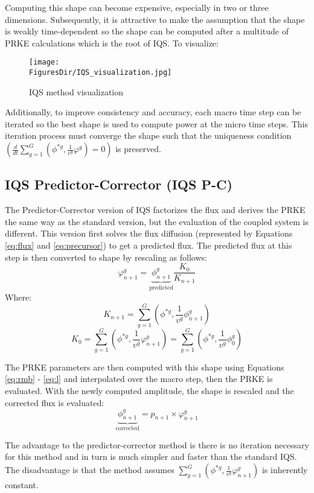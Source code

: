 \documentclass[12pt]{scrartcl}
\newcommand{\be}{\begin{equation}}
\newcommand{\ee}{\end{equation}}
\newcommand{\FiguresDir}{./figs}
\begin{document}
Computing this shape can become expensive, especially in two or three dimensions.  Subsequently, it is attractive to make the assumption that the shape is weakly time-dependent so the shape can be computed after a multitude of PRKE calculations which is the root of IQS.  To visualize:
\begin{figure}[!htbp]
\texttt{[image: \\FiguresDir/IQS\_visualization.jpg]}
\caption{IQS method visualization}
\end{figure}

Additionally, to improve consistency and accuracy, each macro time step can be iterated so the best shape is used to compute power at the micro time steps.  This iteration process must converge the shape such that the uniqueness condition $(\frac{d}{dt}\sum_{g=1}^G\left(\phi^{*g},\frac{1}{v^g}\varphi^g\right)=0)$ is preserved.

\subsection{IQS Predictor-Corrector (IQS P-C)}

The Predictor-Corrector version of IQS factorizes the flux and derives the PRKE the same way as the standard version, but the evaluation of the coupled system is different.  This version first solves the flux diffusion (represented by Equations \ref{eq:flux} and \ref{eq:precursor}) to get a predicted flux.  The predicted flux at this step is then converted to shape by rescaling as follows:
\be
\varphi^g_{n+1} = \underbrace{\phi^g_{n+1}}_{\text{predicted}} \frac{K_0}{K_{n+1}}
\label{eq:rescale}
\ee
Where:
\be
K_{n+1} =\sum_{g=1}^G\left(\phi^{*g},\frac{1}{v^g}\phi^g_{n+1}\right)
\ee
\be
K_{0} =\sum_{g=1}^G\left(\phi^{*g},\frac{1}{v^g}\varphi^g_{n+1}\right)=\sum_{g=1}^G\left(\phi^{*g},\frac{1}{v^g}\phi^g_{0}\right)
\ee

The PRKE parameters are then computed with this shape using Equations \ref{eq:rmb} - \ref{eq:l} and interpolated over the macro step, then the PRKE is evaluated.  With the newly computed amplitude, the shape is rescaled and the corrected flux is evaluated:
\be
\underbrace{\phi^g_{n+1}}_{\text{corrected}} = p_{n+1} \times \varphi^g_{n+1}
\ee

The advantage to the predictor-corrector method is there is no iteration necessary for this method and in turn is much simpler and faster than the standard IQS.  The disadvantage is that the method assumes $\sum_{g=1}^G\left(\phi^{*g},\frac{1}{v^g}\varphi^g_{n+1}\right)$ is inherently constant.
\end{document}
